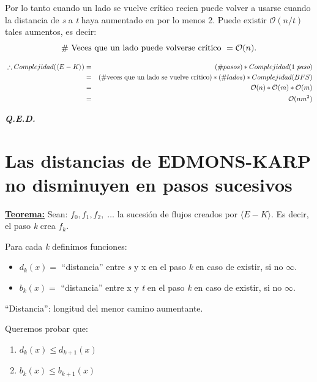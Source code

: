 \documentclass[12pt,a4paper]{report}
\newcommand{\QED}{\hfill \textit{\textbf{Q.E.D.}}}
\begin{document}
  			\vspace{5mm}
  			\par Por lo tanto cuando un lado se vuelve crítico recien puede volver a usarse cuando la distancia de \textit{s} a \textit{t} haya aumentado en por lo menos 2. Puede existir $\mathcal{O}(n/t)$ tales aumentos, es decir:
  				\[ \# \textup{ Veces que un lado puede volverse crítico } = \mathcal{O}(n). \]

  			\begin{eqnarray}
  				\nonumber \; \therefore Complejidad(\langle E-K\rangle) &=& (\# pasos) * Complejidad(1 \; \textit{paso}) \\
  				\nonumber &=& (\# \textup{veces que un lado se vuelve crítico}) * (\# lados) * Complejidad(BFS) \\
  				\nonumber  &=& \mathcal{O}(n) * \mathcal{O}(m)* \mathcal{O}(m) \\
  				\nonumber &=& \mathcal{O}(nm^{2})
  			\end{eqnarray}

  		\QED

  	\pagebreak
  	\section{Las distancias de EDMONS-KARP no disminuyen en pasos sucesivos}
  		\textbf{\underline{Teorema:}} Sean: $f_{0}, f_{1}, f_{2}, \; \dotsc$ \; la sucesión de flujos creados por $\langle E-K\rangle$. Es decir, el paso \textit{k} crea $f_{k}$.

  			\vspace{5mm}
  			\par Para cada \textit{k} definimos funciones:

  			\begin{itemize}
  				\item $d_{k}(x) =$ \textquotedblleft distancia\textquotedblright \; entre \textit{s} y x en el paso \textit{k} en caso de existir, si no $\infty$.
  				\item $b_{k}(x) =$ \textquotedblleft distancia\textquotedblright \; entre x y \textit{t} en el paso \textit{k} en caso de existir, si no $\infty$.
  			\end{itemize}

  			\textquotedblleft Distancia\textquotedblright: longitud del menor camino aumentante.

  			\vspace{5mm}
  			\par Queremos probar que:
  			\begin{enumerate}
  				\item $d_{k}(x) \leq d_{k + 1}(x)$
  				\item $b_{k}(x) \leq b_{k + 1}(x)$
  			\end{enumerate}
\end{document}

